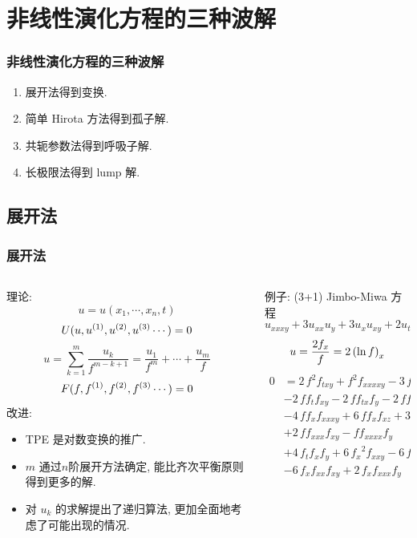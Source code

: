 \section{非线性演化方程的三种波解}
\begin{frame}
\frametitle{非线性演化方程的三种波解}
\begin{enumerate}
\item \Painleve{}展开法得到变换.
\item 简单 Hirota 方法得到孤子解.
\item 共轭参数法得到呼吸子解.
\item 长极限法得到 lump 解.
\end{enumerate}
\end{frame}

\subsection{\Painleve{}展开法}
\begin{frame}
\frametitle{\Painleve{}展开法}
\begin{columns}
\small 
\begin{column}{0.5\textwidth}
理论:
\[
    u=u(x_1,\cdots,x_n,t)
\]
\[
    U(u,u^{(1)},u^{(2)},u^{(3)}\cdots)=0
\]
\[
    u=\sum_{k=1}^m{\frac{u_k}{f^{m-k+1}}}=\frac{u_1}{f^m}+\cdots+\frac{u_m}{f}
\]
\[
    F(f,f^{(1)},f^{(2)},f^{(3)}\cdots)=0
\]
改进:
\begin{itemize}
\item TPE 是对数变换的推广.
\item $m$ 通过$n$阶展开方法确定, 能比齐次平衡原则得到更多的解.
\item 对 $u_k$ 的求解提出了递归算法, 更加全面地考虑了可能出现的情况.
\end{itemize}
\end{column}
\begin{column}{0.5\textwidth}
例子: (3+1) Jimbo-Miwa 方程
\[
    u_{xxxy}+3u_{xx}u_y+3u_{x}u_{xy}+2u_{ty}-3u_{xz}=0
\]
\[
    u=\frac{2f_x}{f}=2\left(\ln f\right)_x
\]
\[
\begin{split}
    0&=2\,{f}^{2}f_{{{ txy}}}+{f}^{2}f_{{{ xxxxy}}}-3\,{f}^{2}f_{{{ xxz}}}\\
    &-2\,ff_{{t}}f_{{{ xy}}}-2\,ff_{{{ tx}}}f_{{y}}-2\,ff_{{{ ty}}}f_{{x}}\\
    &-4\,ff_{{x}}f_{{{ xxxy}}}+6\,ff_{{x}}f_{{{ xz}}}+3\,ff_{{{ xx}}}f_{{z}}\\
    &+2\,ff_{{{ xxx}}}f_{{{xy}}}-ff_{{{ xxxx}}}f_{{y}}\\
    &+4\,f_{{t}}f_{{x}}f_{{y}}+6\,{f_{{x}}}^{2}f_{{{ xxy}}}-6\,{f_{{x}}}^{2}f_{{z}}\\
    &-6\,f_{{x}}f_{{{ xx}}}f_{{{ xy}}}+2\,f_{{x}}f_{{{ xxx}}}f_{{y}}
\end{split}
\]
\end{column}
\end{columns}
\end{frame}

